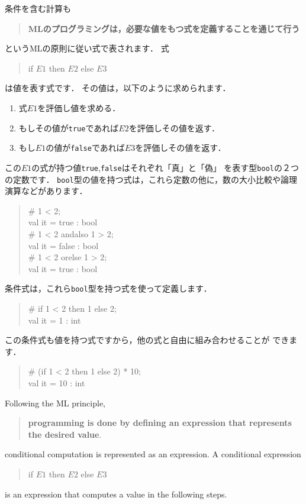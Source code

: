\documentclass{jbook}
\newenvironment{program}{\begin{quote}\begin{tt}}%
                        {\end{tt}\end{quote}}
\begin{document}
\ifjp%
	条件を含む計算も
\begin{quote}
{\bf MLのプログラミングは，必要な値をもつ式を定義することを通じて行う}
\end{quote}
というMLの原則に従い式で表されます．
	式
\begin{program}
if $E1$ then $E2$ else $E3$
\end{program}
は値を表す式です．
	その値は，以下のように求められます．
\begin{enumerate}
\item 式$E1$を評価し値を求める．
\item もしその値が{\tt true}であれば$E2$を評価しその値を返す．
\item もし$E1$の値が{\tt false}であれば$E3$を評価しその値を返す．
\end{enumerate}
	この$E1$の式が持つ値{\tt true},{\tt false}はそれぞれ「真」と「偽」
を表す型{\tt bool}の２つの定数です．
	{\tt bool}型の値を持つ式は，これら定数の他に，数の大小比較や論理
演算などがあります．
\begin{program}
\# 1 < 2;\\
val it = true : bool\\
\# 1 < 2 andalso 1 > 2;\\
val it = false : bool\\
\# 1 < 2 orelse 1 > 2;\\
val it = true : bool
\end{program}
	条件式は，これら{\tt bool}型を持つ式を使って定義します．
\begin{program}
\# if 1 < 2 then 1 else 2;\\
val it = 1 : int
\end{program}
	この条件式も値を持つ式ですから，他の式と自由に組み合わせることが
できます．
\begin{program}
\# (if 1 < 2 then 1 else 2) * 10;\\
val it = 10 : int
\end{program}
\else%
	Following the ML principle,
\begin{quote}
{\bf programming is done by defining an expression that represents the desired value}.
\end{quote}
conditional computation is represented as an expression.
	A conditional expression
\begin{program}
if $E1$ then $E2$ else $E3$
\end{program}
is an expression that computes a value in the following steps.
\end{document}

